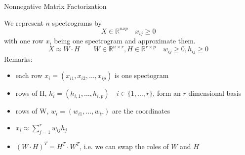 \documentclass[aspectratio=169]{beamer}
\begin{document}

\begin{frame}{Nonnegative Matrix Factorization}

We represent $n$ spectrograms by
\begin{equation*}
X \in \mathbb{R}^{n x p}  \quad x_{i j} \geq 0
\end{equation*}
with one row $x_i$ being one spectrogram and approximate them.
\begin{equation*}
X \approx W \cdot H    \qquad  W \in \mathbb{R}^{n \times r}, H \in \mathbb{R}^{r \times p} \quad w_{i j} \geq 0 , h_{i j} \geq 0
\end{equation*}
Remarks:
\begin{itemize}
\item each row  $x_i = (x_{i 1}, x_{i 2}, \dots , x_{i p} ) $ is one spectogram
\item rows of H, $h_i = (h_{i, 1}, \dots , h_{i, p})   \quad i \in \{1, \dots , r \}$, form an $r$ dimensional basis
\item rows of W, $w_i = (w_{i 1}, \dots , w_{i r} )$ are the coordinates
\item $x_i \approx \sum_{j=1}^{r} w_{i j } h_{j} $ 
\item $(W \cdot H)^T = H^T \cdot W^T $, i.e. we can swap the roles of $W$ and $H$
\end{itemize}
\end{frame}

\end{document}

